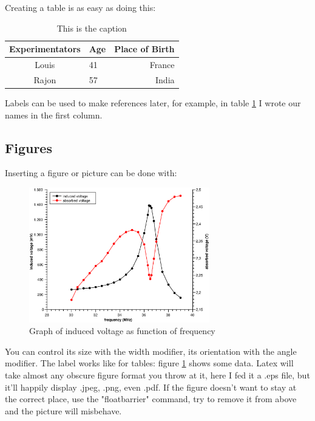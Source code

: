 \documentclass{article}
\begin{document}
Creating a table is as easy as doing this:

\begin{table}[!ht] %
    \centering
    \begin{tabular}{c|lr} %
        Experimentators & Age & Place of Birth \\ \hline
        Louis           & 41  & France \\
        Rajon           & 57  & India
    \end{tabular}
    \caption{This is the caption}
    \label{tab:TableAboutSomething}
\end{table}

Labels can be used to make references later, for example, in table \ref{tab:TableAboutSomething} I wrote our names in the first column.

\subsection{Figures}

Inserting a figure or picture can be done with:

\begin{figure}[!ht]
    \centering
    \includegraphics[width=0.7\textwidth,angle=0]{Capacitor1.eps}
    \caption{Graph of induced voltage as function of frequency}
    \label{fig:inducedV(frequency)}
\end{figure}
\FloatBarrier

You can control its size with the width modifier, its orientation with the angle modifier. The label works like for tables: figure \ref{fig:inducedV(frequency)} shows some data. Latex will take almost any obscure figure format you throw at it, here I fed it a .eps file, but it'll happily display .jpeg, .png, even .pdf. If the figure doesn't want to stay at the correct place, use the "floatbarrier" command, try to remove it from above and the picture will misbehave.
\end{document}
